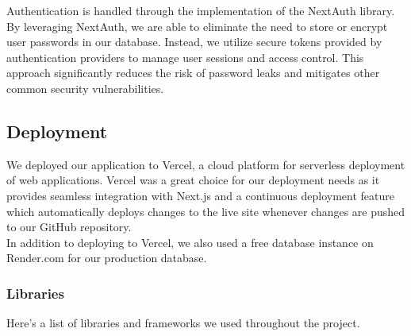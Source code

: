 \noindent
Authentication is handled through the implementation of the NextAuth library. By leveraging NextAuth, we are able to eliminate the need to store or encrypt user passwords in our database. Instead, we utilize secure tokens provided by authentication providers to manage user sessions and access control. This approach significantly reduces the risk of password leaks and mitigates other common security vulnerabilities.

\subsection{Deployment}

We deployed our application to Vercel, a cloud platform for serverless deployment of web applications. Vercel was a great choice for our deployment needs as it provides seamless integration with Next.js and a continuous deployment feature which automatically deploys changes to the live site whenever changes are pushed to our GitHub repository. \\

\noindent
In addition to deploying to Vercel, we also used a free database instance on Render.com for our production database. \\

\subsubsection{Libraries}

Here's a list of libraries and frameworks we used throughout the project. 

